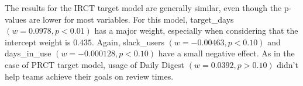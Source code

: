 

The results for the IRCT target model are generally similar, even though the p-values are lower for most variables. For this model, target\_days $(w=0.0978, p<0.01)$ has a major weight, especially when considering that the intercept weight is $0.435$. Again, slack\_users $(w=-0.00463, p<0.10)$ and days\_in\_use $(w=-0.000128, p<0.10)$ have a small negative effect. As in the case of PRCT target model, usage of Daily Digest $(w=0.0392, p>0.10)$ didn't help teams achieve their goals on review times.



